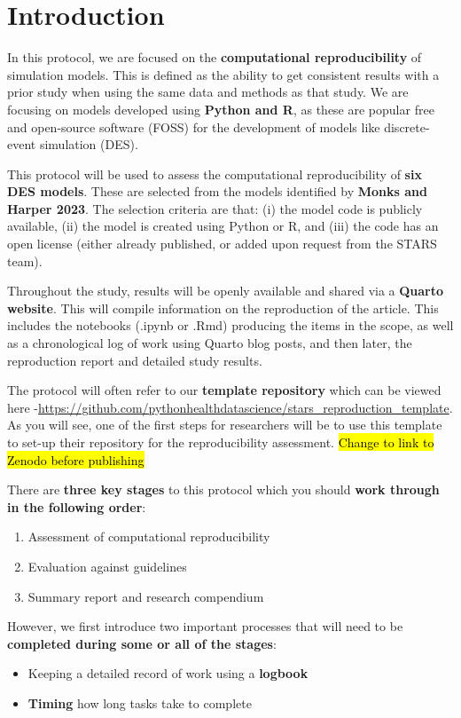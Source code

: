 \section{Introduction}

In this protocol, we are focused on the \textbf{computational reproducibility} of simulation models. This is defined as the ability to get consistent results with a prior study when using  the same data and methods as that study. We are focusing on models developed using \textbf{Python and R}, as these are popular free and open-source software (FOSS) for the development of models like discrete-event simulation (DES).\autocite{monks_computer_2023}

This protocol will be used to assess the computational reproducibility of \textbf{six DES models}. These are selected from the models identified by \textbf{Monks and Harper 2023}.\autocite{monks_computer_2023} The selection criteria are that: (i) the model code is publicly available, (ii) the model is created using Python or R, and (iii) the code has an open license (either already published, or added upon request from the STARS team).

Throughout the study, results will be openly available and shared via a \textbf{Quarto website}. This will compile information on the reproduction of the article. This includes the notebooks (.ipynb or .Rmd) producing the items in the scope, as well as a chronological log of work using Quarto blog posts, and then later, the reproduction report and detailed study results.

The protocol will often refer to our \textbf{template repository} which can be viewed here -\url{https://github.com/pythonhealthdatascience/stars_reproduction_template}. As you will see, one of the first steps for researchers will be to use this template to set-up their repository for the reproducibility assessment. \hl{Change to link to Zenodo before publishing}

There are \textbf{three key stages} to this protocol which you should \textbf{work through in the following order}:
\begin{enumerate}
    \item Assessment of computational reproducibility
    \item Evaluation against guidelines
    \item Summary report and research compendium
\end{enumerate}

However, we first introduce two important processes that will need to be \textbf{completed during some or all of the stages}:
\begin{itemize}
    \item Keeping a detailed record of work using a \textbf{logbook}
    \item \textbf{Timing} how long tasks take to complete
\end{itemize}

